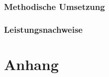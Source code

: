 \documentclass[
11pt,
captions=tableheading,
smallheadings,
headsepline,
footsepline, 
captions=tableheading,
parskip=half-,
]{scrartcl}
\begin{document}
\subsubsection{Methodische Umsetzung}
\subsubsection{Leistungsnachweise}





\clearpage
{}

\printbibliography

\clearpage
\appendix

\section{Anhang}
%
\end{document}
